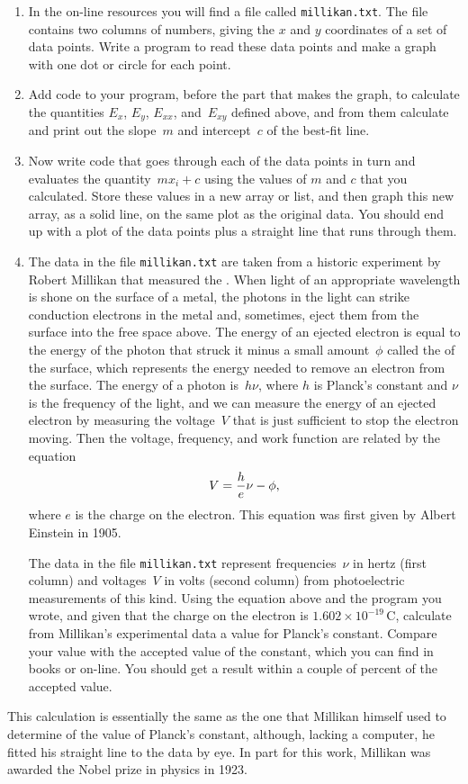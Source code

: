 \documentclass[12pt]{article}
\begin{document}
\begin{exercises}
\begin{enumerate}\setlength{\itemsep}{0pt}
\item In the on-line resources you will find a file called
  \verb|millikan.txt|.  The file contains two columns of numbers, giving
  the $x$ and $y$ coordinates of a set of data points.  Write a program to
  read these data points and make a graph with one dot or circle for each
  point.
\item Add code to your program, before the part that makes the graph, to
  calculate the quantities $E_x$, $E_y$, $E_{xx}$, and~$E_{xy}$ defined
  above, and from them calculate and print out the slope~$m$ and
  intercept~$c$ of the best-fit line.
\item Now write code that goes through each of the data points in turn and
  evaluates the quantity~$mx_i+c$ using the values of $m$ and $c$ that you
  calculated.  Store these values in a new array or list, and then graph
  this new array, as a solid line, on the same plot as the original data.
  You should end up with a plot of the data points plus a straight line
  that runs through them.
\item The data in the file \verb|millikan.txt| are taken from a historic
  experiment by Robert Millikan that measured the
  .  When light of an appropriate wavelength is
  shone on the surface of a metal, the photons in the light can strike
  conduction electrons in the metal and, sometimes, eject them from the
  surface into the free space above.  The energy of an ejected electron is
  equal to the energy of the photon that struck it minus a small
  amount~$\phi$ called the  of the surface,
  which represents the energy needed to remove an electron from the
  surface.  The energy of a photon is~$h\nu$, where $h$ is Planck's
  constant and $\nu$ is the frequency of the light, and we can measure the
  energy of an ejected electron by measuring the voltage~$V$ that is just
  sufficient to stop the electron moving.  Then the voltage, frequency, and
  work function are related by the equation
\begin{displaymath}
V = {h\over e}\nu - \phi,
\end{displaymath}
where $e$ is the charge on the electron.  This equation was first given by
Albert Einstein in 1905.

The data in the file \verb|millikan.txt| represent frequencies~$\nu$ in
hertz (first column) and voltages~$V$ in volts (second column) from
photoelectric measurements of this kind.  Using the equation above and the
program you wrote, and given that the charge on the electron is
$1.602\times10^{-19}\,$C, calculate from Millikan's experimental data a
value for Planck's constant.  Compare your value with the accepted value of
the constant, which you can find in books or on-line.  You should get a
result within a couple of percent of the accepted value.
\end{enumerate}
This calculation is essentially the same as the one that Millikan himself
used to determine of the value of Planck's constant, although, lacking a
computer, he fitted his straight line to the data by eye.  In part for this
work, Millikan was awarded the Nobel prize in physics in 1923.

\end{exercises}
\end{document}
